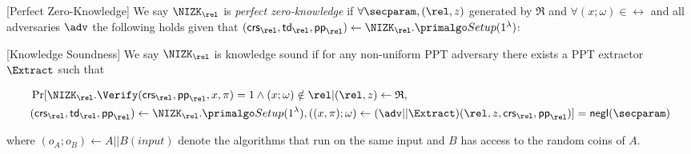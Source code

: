 \def\advV{\ensuremath{V^*}\xspace} %

\begin{definition}\label{def:nizk_zero_knowledge}[Perfect Zero-Knowledge]
	We say $\NIZK_\rel$ is {\em perfect zero-knowledge} if $ \forall \secparam, (\rel,z) $ generated by $  \mathfrak{R} $ and $ \forall (x;\omega) \in \rel $ and all adversaries $ \adv $ the following holds given that  $ (\crs_\rel, \tw_\rel, \pp_\rel) \leftarrow \NIZK_\rel.\Setup (1^{\lambda})$:
	\allowbreak
	\doublecolumn{\begin{align*}
		\Pr[& \adv(\crs_\rel,  \pp_\rel, z, \pi,\rel) = 1 \ | \ (\crs_\rel, \tw_\rel,  \pp_\rel) \leftarrow \NIZK_\rel.\Setup (1^{\lambda}),  \\\nonumber
		& \pi \leftarrow \NIZK_\rel.\Prove (\crs_\rel, \pp_\rel, x;\omega)]\\
		=\Pr[& \adv(\crs_\rel,  \pp_\rel, z, \pi,\rel) = 1 \ | \ (\crs_\rel, \tw,  \pp_\rel) \leftarrow \NIZK_\rel.\Setup (1^{\lambda}), \\\nonumber
		&  \pi \leftarrow \NIZK_\rel.\Simulate (\tw_\rel,  \pp_\rel, x)]
	\end{align*}
}{
\begin{footnotesize}
\begin{align*}
	\Pr[& \adv(\crs_\rel, \pp_\rel, z, \pi,\rel) = 1 \ |  \pi \leftarrow \NIZK_\rel.\Prove (\crs_\rel,  \pp_\rel, x; \omega)]\\
	=\Pr[& \adv(\crs_\rel,  \pp_\rel, z, \pi,\rel) = 1 \ |    \pi \leftarrow \NIZK_\rel.\Simulate (\tw_\rel,  \pp_\rel, x)]
\end{align*}
\end{footnotesize}}
	
\end{definition}

\def\advP{\ensuremath{P^*}\xspace} %

\begin{definition}\label{def:nizk_knowledge_sound}[Knowledge Soundness]
	We say $\NIZK_\rel$ is {knowledge sound}  if %
	for any non-uniform PPT adversary \adv there exists a PPT extractor $ \Extract $
	such that
	\begin{footnotesize}
	\begin{align}
		&\Pr[\NIZK_\rel.\Verify(\crs_\rel, \pp_\rel, x,\pi) = 1 \wedge  (x;\omega) \notin \rel | (\rel,z) \leftarrow \mathfrak{R},   \nonumber \\
		&(\crs_\rel,\tw_\rel,  \pp_\rel) \leftarrow \NIZK_\rel.\Setup(1^{\lambda}), ((x,\pi);\omega)\leftarrow (\adv||\Extract)(\rel, z, \crs_\rel,  \pp_\rel)] =  \negl(\secparam) \nonumber
	\end{align}
\end{footnotesize}
	\noindent where $ (o_A;o_B)\leftarrow A||B(input) $ denote the algorithms that run on the same input and $ B $ has access to the random coins of $ A $.
\end{definition}

